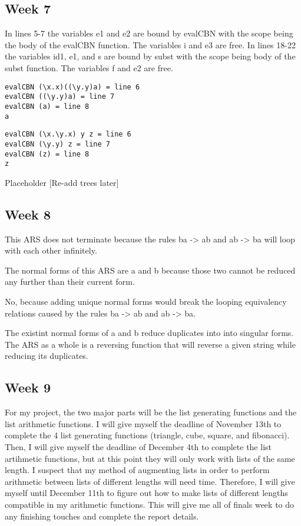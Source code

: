 \documentclass{article}
\theoremstyle{theorem}
\theoremstyle{definition}
\theoremstyle{remark}
\begin{document}
\subsection{Week 7}

In lines 5-7 the variables e1 and e2 are bound by evalCBN with the scope being the body of the evalCBN function. The variables i and e3 are free. In lines 18-22 the variables id1, e1, and s are bound by subst with the scope being body of the subst function. The variables f and e2 are free.

\begin{lstlisting}
evalCBN (\x.x)((\y.y)a) = line 6
evalCBN ((\y.y)a) = line 7
evalCBN (a) = line 8
a
\end{lstlisting}
\begin{lstlisting}
evalCBN (\x.\y.x) y z = line 6
evalCBN (\y.y) z = line 7
evalCBN (z) = line 8
z
\end{lstlisting}

Placeholder [Re-add trees later]

\subsection{Week 8}
This ARS does not terminate because the rules ba -> ab and ab -> ba will loop with each other infinitely.

\medskip\noindent
The normal forms of this ARS are a and b because those two cannot be reduced any further than their current form.

\medskip\noindent
No, because adding unique normal forms would break the looping equivalency relations caused by the rules ba -> ab and ab -> ba.

\medskip\noindent
The existint normal forms of a and b reduce duplicates into into singular forms. The ARS as a whole is a reversing function that will reverse a given string while reducing its duplicates.

\subsection{Week 9}
For my project, the two major parts will be the list generating functions and the list arithmetic functions. I will give myself the deadline of November 13th to complete the 4 list generating functions (triangle, cube, square, and fibonacci). Then, I will give myself the deadline of December 4th to complete the list artihmetic functions, but at this point they will only work with lists of the same length. I suspect that my method of augmenting lists in order to perform arithmetic between lists of different lengths will need time. Therefore, I will give myself until December 11th to figure out how to make lists of different lengths compatible in my arithmetic functions. This will give me all of finals week to do any finishing touches and complete the report details.
\end{document}
